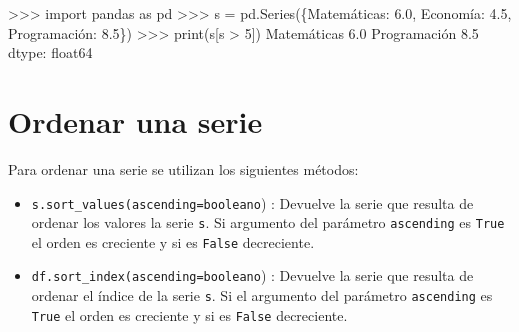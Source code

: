\documentclass[
  spanish,
  a4paper,
]{scrreport}
\newenvironment{Shaded}{\begin{snugshade}}{\end{snugshade}}
\newcommand{\BuiltInTok}[1]{\textcolor[rgb]{0.00,0.23,0.31}{#1}}
\newcommand{\DecValTok}[1]{\textcolor[rgb]{0.68,0.00,0.00}{#1}}
\newcommand{\FloatTok}[1]{\textcolor[rgb]{0.68,0.00,0.00}{#1}}
\newcommand{\ImportTok}[1]{\textcolor[rgb]{0.00,0.46,0.62}{#1}}
\newcommand{\NormalTok}[1]{\textcolor[rgb]{0.00,0.23,0.31}{#1}}
\newcommand{\OperatorTok}[1]{\textcolor[rgb]{0.37,0.37,0.37}{#1}}
\newcommand{\StringTok}[1]{\textcolor[rgb]{0.13,0.47,0.30}{#1}}
\begin{document}
\begin{Shaded}
\begin{Highlighting}[]
\OperatorTok{\textgreater{}\textgreater{}\textgreater{}} \ImportTok{import}\NormalTok{ pandas }\ImportTok{as}\NormalTok{ pd}
\OperatorTok{\textgreater{}\textgreater{}\textgreater{}}\NormalTok{ s }\OperatorTok{=}\NormalTok{ pd.Series(\{}\StringTok{\textquotesingle{}Matemáticas\textquotesingle{}}\NormalTok{: }\FloatTok{6.0}\NormalTok{,  }\StringTok{\textquotesingle{}Economía\textquotesingle{}}\NormalTok{: }\FloatTok{4.5}\NormalTok{, }\StringTok{\textquotesingle{}Programación\textquotesingle{}}\NormalTok{: }\FloatTok{8.5}\NormalTok{\})}
\OperatorTok{\textgreater{}\textgreater{}\textgreater{}} \BuiltInTok{print}\NormalTok{(s[s }\OperatorTok{\textgreater{}} \DecValTok{5}\NormalTok{])}
\NormalTok{Matemáticas     }\FloatTok{6.0}
\NormalTok{Programación    }\FloatTok{8.5}
\NormalTok{dtype: float64}
\end{Highlighting}
\end{Shaded}

\section{Ordenar una serie}\label{ordenar-una-serie}

Para ordenar una serie se utilizan los siguientes métodos:

\begin{itemize}
\item
  \texttt{s.sort\_values(ascending=booleano}) : Devuelve la serie que
  resulta de ordenar los valores la serie \texttt{s}. Si argumento del
  parámetro \texttt{ascending} es \texttt{True} el orden es creciente y
  si es \texttt{False} decreciente.
\item
  \texttt{df.sort\_index(ascending=booleano}) : Devuelve la serie que
  resulta de ordenar el índice de la serie \texttt{s}. Si el argumento
  del parámetro \texttt{ascending} es \texttt{True} el orden es
  creciente y si es \texttt{False} decreciente.
\end{itemize}
\end{document}
